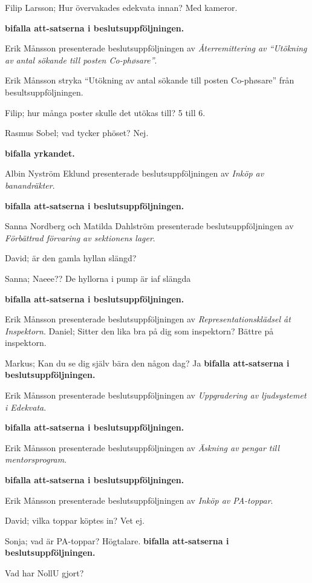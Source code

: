 \documentclass[10pt]{article}
\begin{document}
\begin{paragrafer}
Filip Larsson; Hur övervakades edekvata innan? Med kameror.

\textbf{\Mba bifalla att-satserna i beslutsuppföljningen.}

Erik Månsson presenterade beslutsuppföljningen av \emph{Återremittering av
``Utökning av antal sökande till posten Co-phøsare''}.

Erik Månsson \ypa stryka ``Utökning av antal sökande till posten Co-phøsare'' från besultsuppföljningen.

Filip; hur många poster skulle det utökas till? 5 till 6.

Rasmus Sobel; vad tycker phöset? Nej.

\textbf{\Mba bifalla yrkandet.}

Albin Nyström Eklund presenterade beslutsuppföljningen av \emph{Inköp av banandräkter}.

\textbf{\Mba bifalla att-satserna i beslutsuppföljningen.}

Sanna Nordberg och Matilda Dahlström presenterade beslutsuppföljningen av \emph{Förbättrad förvaring av sektionens lager}.

David; är den gamla hyllan slängd?

Sanna; Naeee?? De hyllorna i pump är iaf slängda

\textbf{\Mba bifalla att-satserna i beslutsuppföljningen.}

Erik Månsson presenterade beslutsuppföljningen av \emph{Representationsklädsel åt Inspektorn}.
Daniel; Sitter den lika bra på dig som inspektorn? Bättre på inspektorn.

Markus; Kan du se dig själv bära den någon dag? Ja
\textbf{\Mba bifalla att-satserna i beslutsuppföljningen.}

Erik Månsson presenterade beslutsuppföljningen av \emph{Uppgradering av ljudsystemet i Edekvata}.

\textbf{\Mba bifalla att-satserna i beslutsuppföljningen.}

Erik Månsson presenterade beslutsuppföljningen av \emph{Äskning av pengar till mentorsprogram}.

\textbf{\Mba bifalla att-satserna i beslutsuppföljningen.}

Erik Månsson presenterade beslutsuppföljningen av \emph{Inköp av PA-toppar}.

David; vilka toppar köptes in? Vet ej.

Sonja; vad är PA-toppar? Högtalare.
\textbf{\Mba bifalla att-satserna i beslutsuppföljningen.}

Vad har NollU gjort?


\end{paragrafer}
\end{document}
